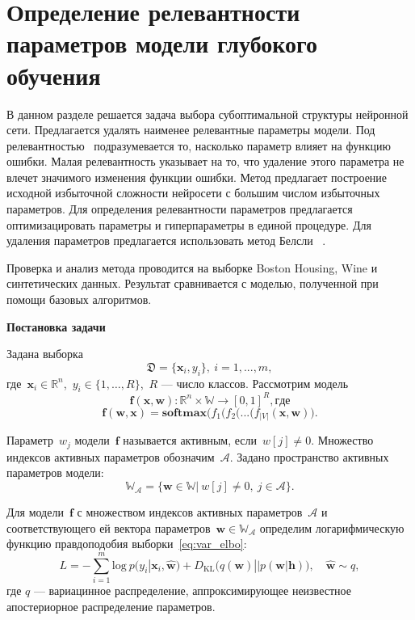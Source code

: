 





























\section{Определение релевантности параметров модели глубокого обучения}
В данном разделе решается задача выбора субоптимальной структуры нейронной сети. Предлагается удалять наименее релевантные параметры модели. Под релевантностью~\cite{nips} подразумевается то, насколько параметр влияет на функцию ошибки. Малая релевантность указывает на то, что удаление этого параметра не влечет значимого изменения функции ошибки. Метод предлагает построение исходной избыточной сложности нейросети с большим числом избыточных параметров. Для определения релевантности параметров предлагается оптимизацировать параметры и гиперпараметры в единой процедуре. Для удаления параметров предлагается использовать метод Белсли~\cite{neychev} .

Проверка и анализ метода проводится на выборке Boston Housing, Wine и синтетических данных. Результат сравнивается с моделью, полученной при помощи базовых алгоритмов.

\textbf{Постановка задачи}

Задана выборка
$$\mathfrak{D} = \{\textbf{x}_i,y_i\},~ i =1,...,m,$$
где~$\textbf{x}_i \in \mathbb{R}^{n}$,~$y_i \in \{1, \dots, R\}$,~$R$ --- число классов.
Рассмотрим модель~$$\mathbf{f}(\mathbf{x}, \mathbf{w}): \mathbb{R}^n \times \mathbb{W} \to [0,1]^R, где$$
$$\mathbf{f}(\mathbf{w}, \mathbf{x}) = \textbf{softmax}\bigl( f_1(f_2(...(f_{|V|}(\mathbf{x}, \mathbf{w})\bigr).$$

Параметр~$w_j$ модели~$\mathbf{f}$  называется активным, если~$w[j] \not = 0$. Множество индексов активных параметров обозначим~$\mathcal{A}$.
Задано пространство активных параметров модели:
$$\mathbb{W_\mathcal{A}} = \{ \textbf{w} \in \mathbb{W}|~w[j]\not=0,~j \in \mathcal{A}  \}.$$


Для модели~$\mathbf{f}$ с множеством индексов активных параметров~$\mathcal{A}$ и соответствующего ей вектора параметров~$\textbf{w} \in \mathbb{W_\mathcal{A}}$  определим логарифмическую функцию правдоподобия выборки~\eqref{eq:var_elbo}:
\begin{equation}
\label{eq:applied_elbo}
    L = -\sum_{i=1}^m \text{log}~p({y}_i|\mathbf{x}_i, \hat{\mathbf{w}}) + D_\text{KL}\bigl(q (\mathbf{w}) || p (\mathbf{w}|\mathbf{h})\bigr),\quad \hat{\mathbf{w}} \sim q,
\end{equation}
где $q$ --- вариацинное распределение, аппроксимирующее неизвестное апостериорное распределение параметров.

